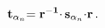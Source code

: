 \begin{equation}
   \label{weyl} {\bf   t}_{\alpha_n}{\bf= r^{-1}}{\bf \cdot\,  s}_{\alpha_n}{\bf
\cdot r}\, .
   \end{equation} 
